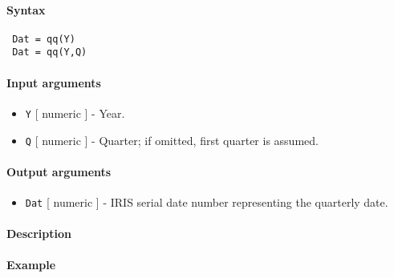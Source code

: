 


	\paragraph{Syntax}
 
 \begin{verbatim}
 Dat = qq(Y)
 Dat = qq(Y,Q)
 \end{verbatim}
 
 \paragraph{Input arguments}
 
 \begin{itemize}
 \item
   \texttt{Y} {[} numeric {]} - Year.
 \item
   \texttt{Q} {[} numeric {]} - Quarter; if omitted, first quarter is
   assumed.
 \end{itemize}
 
 \paragraph{Output arguments}
 
 \begin{itemize}
 \item
   \texttt{Dat} {[} numeric {]} - IRIS serial date number representing
   the quarterly date.
 \end{itemize}
 
 \paragraph{Description}
 
 \paragraph{Example}


